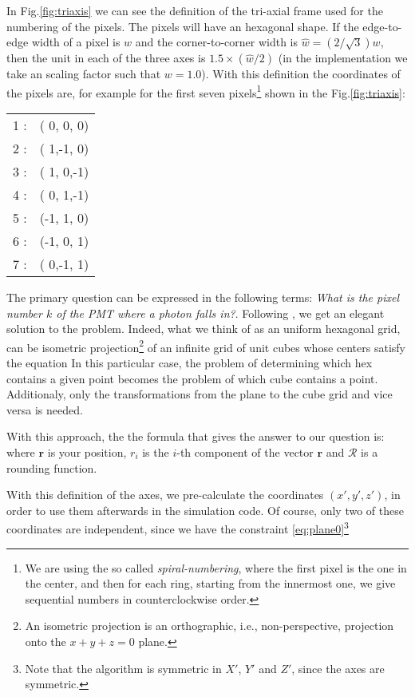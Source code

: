 In Fig.\ref{fig:triaxis} we can see the definition of the tri-axial
frame used for the numbering of the pixels. The pixels will have an
hexagonal shape. If the edge-to-edge width of a pixel is $w$ and the
corner-to-corner width is $\hat{w}=(2/\sqrt{3}) w$, then the unit in
each of the three axes is $1.5\times (\hat{w}/2)$ (in the
implementation we take an scaling factor such that $w=1.0$).  With
this definition the coordinates of the pixels are, for example for the
first seven pixels\footnote{We are using the so called
  \emph{spiral-numbering}, where the first pixel is the one in the
  center, and then for each ring, starting from the innermost one, we
  give sequential numbers in counterclockwise order.} shown in the
Fig.\ref{fig:triaxis}:
%
\begin{center}
  \begin{tabular}{rc}
    1 :& ( 0, 0, 0) \\
    2 :& ( 1,-1, 0) \\
    3 :& ( 1, 0,-1) \\
    4 :& ( 0, 1,-1) \\
    5 :& (-1, 1, 0) \\
    6 :& (-1, 0, 1) \\
    7 :& ( 0,-1, 1) \\
  \end{tabular}
\end{center}

The primary question can be expressed in the following terms:
\emph{What is the pixel number $k$ of the PMT where a photon falls
  in?}.  Following \cite{Fu:hexgrid}, we get an elegant solution to
the problem. Indeed, what we think of as an uniform hexagonal grid,
can be isometric projection\footnote{An isometric projection is an
  orthographic, i.e., non-perspective, projection onto the $x+y+z=0$
  plane.} of an infinite grid of unit cubes whose centers satisfy the
equation
%
\planeeq
%
In this particular case, the problem of determining which hex contains
a given point becomes the problem of which cube contains a point.
Additionaly, only the transformations from the plane to the cube grid
and vice versa is needed.

With this approach, the the formula that gives the answer to our
question is:
%
\hexgrideq
%
where $\mathbf{r}$ is your position, $r_i$ is the $i$-th component of
the vector $\mathbf{r}$ and $\mathcal{R}$ is a rounding function.

\triaxisfig

With this definition of the axes, we pre-calculate the coordinates
$(x',y',z')$, in order to use them afterwards in the simulation code.
Of course, only two of these coordinates are independent, since we
have the constraint \eqref{eq:plane0}\footnote{Note that the algorithm
  is symmetric in $X'$, $Y'$ and $Z'$, since the axes are symmetric.}
  
